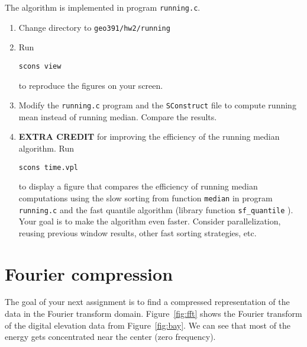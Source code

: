 
The algorithm is implemented in program \texttt{running.c}.



\begin{enumerate}
\item Change directory to \verb#geo391/hw2/running#
\item Run 
\begin{verbatim}
scons view
\end{verbatim}
to reproduce the figures on your screen.
\item Modify the \texttt{running.c} program and the \texttt{SConstruct} file to compute running mean instead of running median. Compare the results.
\item \textbf{EXTRA CREDIT} for improving the efficiency of the running median algorithm. Run
\begin{verbatim}
scons time.vpl
\end{verbatim}
to display a figure that compares the efficiency of running median computations using the slow sorting from function \texttt{median} in program \texttt{running.c} and the fast quantile algorithm (library function \verb#sf_quantile# ). Your goal is to make the algorithm even faster. Consider parallelization, reusing previous window results, other fast sorting strategies, etc.
\end{enumerate}

\lstset{language=python,numbers=left,numberstyle=\tiny,showstringspaces=false}


\section{Fourier compression}


The goal of your next assignment is to find a compressed
representation of the data in the Fourier transform
domain. Figure~\ref{fig:fft} shows the Fourier transform of the
digital elevation data from Figure~\ref{fig:bay}. We can see that most
of the energy gets concentrated near the center (zero frequency). 

